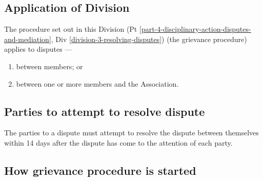 \documentclass[../constitution.tex]{subfiles}
\begin{document}
\hypertarget{application-of-division}{%
\subsection{Application of Division}\label{application-of-division}}

The procedure set out in this Division (Pt \ref{part-4-disciplinary-action-disputes-and-mediation}, Div \ref{division-3-resolving-disputes}) (the grievance procedure) applies to disputes ---

\begin{enumerate}
    \item between members; or
    \item between one or more members and the Association.
\end{enumerate}

\hypertarget{parties-to-attempt-to-resolve-dispute}{%
\subsection{Parties to attempt to resolve dispute}\label{parties-to-attempt-to-resolve-dispute}}

The parties to a dispute must attempt to resolve the dispute between themselves within 14 days after the dispute has come to the attention of each party.

\hypertarget{how-grievance-procedure-is-started}{%
\subsection{How grievance procedure is started}\label{how-grievance-procedure-is-started}}
\end{document}
